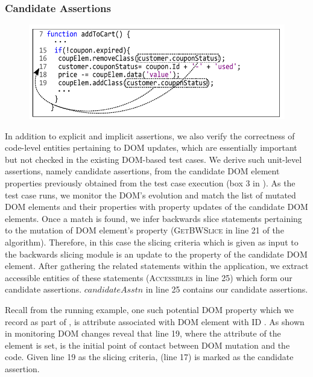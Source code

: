 \subsubsection{Candidate Assertions} \label{Sec:candidateAssertions}
\begin{figure}[!t]
  \centering
  \includegraphics[width=1\hsize]{fig/candidateDOMToCode}
  \vspace{-0.3in} 
  \label{Fig:candidateDOMToCode}
  \vspace{-0.2in} 
\end{figure}
In addition to explicit and implicit assertions, we also verify the correctness of code-level entities pertaining to DOM updates, which are essentially important but not checked in the existing DOM-based test cases. We derive such unit-level assertions, namely candidate assertions, from the candidate DOM element properties previously obtained from the test case execution (box 3 in ). As the test case runs, we monitor the DOM's evolution and match the list of mutated DOM elements and their properties with property updates of the candidate DOM elements. Once a match is found, we infer backwards slice statements pertaining to the mutation of DOM element's property (\textsc{GetBWSlice} in line 21 of the algorithm). Therefore, in this case the slicing criteria which is given as input to the backwards slicing module is an update to the property of the candidate DOM element.
After gathering the related \javascript statements within the application, we extract accessible entities of these statements (\textsc{Accessibles} in line 25) which form our candidate assertions. $candidateAsstn$ in line 25 contains our candidate assertions. 

Recall from the running example, one such potential DOM property which we record as part of , is  attribute associated with DOM element with ID . As shown in  monitoring DOM changes reveal that line 19, where the  attribute of the element is set, is the initial point of contact between DOM mutation and the \javascript code. Given line 19 as the slicing criteria,  (line 17) is marked as the candidate assertion.